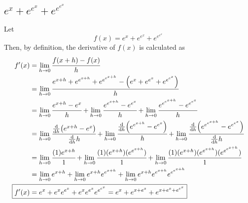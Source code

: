 \documentclass[]{article}
\begin{document}
\subsection{
    $e^x + e^{e^x} + e^{e^{e^x}}$
}
Let
\[
    f(x) = e^x + e^{e^x} + e^{e^{e^x}}
\]
Then, by definition, the derivative of $f(x)$ is calculated as
\begin{align*}
    f'(x) 
    &= \lim_{h \to 0} \cfrac{f(x + h) - f(x)}{h}\\
    &= \lim_{h \to 0} 
        \cfrac{e^{x+h} + e^{e^{x+h}} + e^{e^{e^{x+h}}} - \qty(e^x + e^{e^x} + e^{e^{e^x}})
            }{h}\\
    &= \lim_{h \to 0} \cfrac{e^{x+h} - e^x}{h}
        + \lim_{h \to 0} \cfrac{e^{e^{x + h}} - e^{e^x}}{h}
        + \lim_{h \to 0} \cfrac{e^{e^{e^{x + h}}} - e^{e^{e^x}}}{h}\\
    &= \lim_{h \to 0} \cfrac{
        \dv{h} \qty(e^{x+h} - e^x)
        }{\dv{h} h}
        + \lim_{h \to 0} \cfrac{
            \dv{h} \qty(e^{e^{x + h}} - e^{e^x})
            }{h}
        + \lim_{h \to 0} \cfrac{
            \dv{h} \qty(e^{e^{e^{x + h}}} - e^{e^{e^x}})
            }{\dv{h} h}\\
    &= \lim_{h \to 0} 
            \cfrac{(1)e^{x+h}}{1} 
        + \lim_{h \to 0} 
            \cfrac{
                (1)(e^{x+h})(e^{e^{x+h}})
                }{1}
        + \lim_{h \to 0} 
            \cfrac{
                (1)(e^{x+h})(e^{e^{x+h}})(e^{e^{e^{x+h}}})
                }{1}\\
    &= \lim_{h \to 0} e^{x+h}
        + \lim_{h \to 0} e^{x + h} e^{e^{x + h}}
        + \lim_{h \to 0} e^{x + h} e^{e^{x + h}} e^{e^{e^{x + h}}}\\
    \Aboxed{
        f'(x)
        &=  e^{x} + e^{x} e^{e^{x}} + e^{x} e^{e^{x}} e^{e^{e^{x}}}
        = e^{x} + e^{x + e^{x}} + e^{x + e^{x} + e^{e^{x}}}
    }
\end{align*}

\newpage
\end{document}
